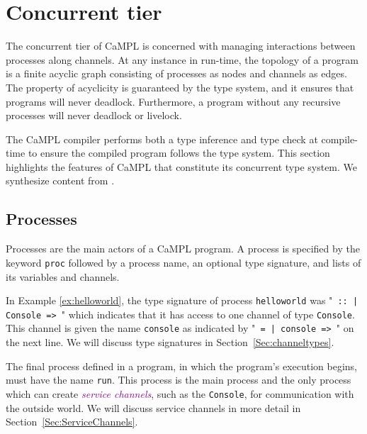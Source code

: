 \documentclass[acmsmall]{acmart}
\newcommand{\tc}[1]{\textcolor{darkMagenta}{\textit{#1}}}
\begin{document}
\section{Concurrent tier}
\label{Sec:ConcurrentTypes}

The concurrent tier of CaMPL is concerned with managing interactions between processes along channels.
At any instance in run-time, the topology of a program is a finite acyclic graph consisting of processes as nodes and channels as edges. 
The property of acyclicity is guaranteed by the type system, and it ensures that programs will never deadlock.
Furthermore, a program without any recursive processes will never deadlock or livelock.

The CaMPL compiler performs both a type inference and type check at compile-time to ensure the compiled program follows the type system.
This section highlights the features of CaMPL that constitute its concurrent type system.
We synthesize content from \cite{Ku18, Po21, Po22, No25}.

\subsection{Processes}
\label{Sec:Processes}

Processes are the main actors of a CaMPL program.
A process is specified by the keyword \lstinline$proc$ followed by a process name, an optional type signature, and lists of its variables and channels.

In Example \ref{ex:helloworld}, the type signature of process \lstinline$helloworld$ was "\lstinline$ :: | Console => $" which indicates that it has access to one channel of type \lstinline$Console$.
This channel is given the name \lstinline$console$ as indicated by "\lstinline$ = | console => $" on the next line.
We will discuss type signatures in Section~\ref{Sec:channeltypes}.

The final process defined in a program, in which the program's execution begins, must have the name \lstinline$run$. 
This process is the main process and the only process which can create \tc{service channels}, such as the \lstinline$Console$, for communication with the outside world.
We will discuss service channels in more detail in Section~\ref{Sec:ServiceChannels}.
\end{document}
